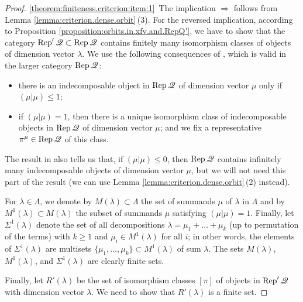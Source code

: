 \documentclass[12pt,reqno]{amsart}
\begin{document}
\begin{proof}
\eqref{theorem:finiteness.criterion:item:1}\
The implication $\Rightarrow$
follows from Lemma \ref{lemma:criterion.dense.orbit}\,(3).
For the reversed implication, according to Proposition \ref{proposition:orbits.in.xfv.and.RepQ'}, we have to show that the category $\Rep'\quiver\subset\Rep\quiver$ contains finitely many isomorphism classes of objects of dimension vector $\lambda$.
We use the following consequences of \cite[Theorem 2]{Kac.Quiver.1980}, which is valid in the larger category $\Rep\quiver$:
\begin{itemize}
    \item[\rm (a)] there is an indecomposable object in $\Rep\quiver$ of dimension vector $\mu$ only if $(\mu|\mu)\leq 1$;
    \item[\rm (b)] if $(\mu|\mu)=1$, then there is a unique isomorphism class of indecomposable objects in $\Rep\quiver$ of dimension vector $\mu$; and we fix a representative $\pi^\mu\in\Rep\quiver$ of this class.
\end{itemize}
The result in \cite[Theorem 3]{Kac.Quiver.1980} also tells us that, if $(\mu|\mu)\leq 0$, then $\Rep\quiver$ contains infinitely many indecomposable objects of dimension vector $\mu$, but we will not need this part of the result (we can use Lemma \ref{lemma:criterion.dense.orbit}\,(2) instead).

For $\lambda\in\Lambda$, we denote by $M(\lambda)\subset\Lambda$ the set of summands $\mu$ of $\lambda$ in $\Lambda$ and by $M^1(\lambda)\subset M(\lambda)$ the subset of summands $\mu$ satisfying $(\mu|\mu)=1$. Finally, let $\Sigma^1(\lambda)$ denote the set of all decompositions $\lambda=\mu_1+\ldots+\mu_k$ (up to permutation of the terms) with $k\geq 1$ and $\mu_i\in M^1(\lambda)$ for all $i$; in other words, the elements of $\Sigma^1(\lambda)$ are multisets $\{\mu_1,\ldots,\mu_k\}\subset M^1(\lambda)$ of sum $\lambda$. The sets $M(\lambda)$, $M^1(\lambda)$, and $\Sigma^1(\lambda)$ are clearly finite sets.

Finally, let $R'(\lambda)$ be the set of isomorphism classes
$[\pi]$ of objects in $\Rep'\quiver$ with dimension vector $\lambda$. We need to show that $R'(\lambda)$ is a finite set.


\end{proof}
\end{document}
